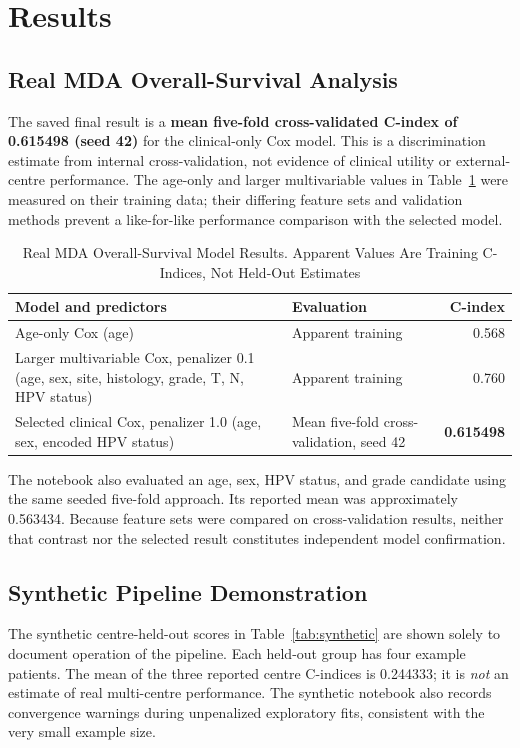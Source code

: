 \documentclass[conference]{IEEEtran}
\begin{document}
\section{Results}
\subsection{Real MDA Overall-Survival Analysis}
The saved final result is a \textbf{mean five-fold cross-validated C-index of 0.615498 (seed 42)} for the clinical-only Cox model. This is a discrimination estimate from internal cross-validation, not evidence of clinical utility or external-centre performance. The age-only and larger multivariable values in Table~\ref{tab:real-results} were measured on their training data; their differing feature sets and validation methods prevent a like-for-like performance comparison with the selected model.

\begin{table}[!htbp]
\caption{Real MDA Overall-Survival Model Results. Apparent Values Are Training C-Indices, Not Held-Out Estimates}
\label{tab:real-results}
\centering
\scriptsize
\begin{tabular}{@{}p{}p{}r@{}}
\toprule
Model and predictors & Evaluation & C-index \\
\midrule
Age-only Cox (age) & Apparent training & 0.568 \\
Larger multivariable Cox, penalizer 0.1 (age, sex, site, histology, grade, T, N, HPV status) & Apparent training & 0.760 \\
Selected clinical Cox, penalizer 1.0 (age, sex, encoded HPV status) & Mean five-fold cross-validation, seed 42 & \textbf{0.615498} \\
\bottomrule
\end{tabular}
\end{table}

The notebook also evaluated an age, sex, HPV status, and grade candidate using the same seeded five-fold approach. Its reported mean was approximately 0.563434. Because feature sets were compared on cross-validation results, neither that contrast nor the selected result constitutes independent model confirmation.

\subsection{Synthetic Pipeline Demonstration}
The synthetic centre-held-out scores in Table~\ref{tab:synthetic} are shown solely to document operation of the pipeline. Each held-out group has four example patients. The mean of the three reported centre C-indices is 0.244333; it is \emph{not} an estimate of real multi-centre performance. The synthetic notebook also records convergence warnings during unpenalized exploratory fits, consistent with the very small example size.
\end{document}
